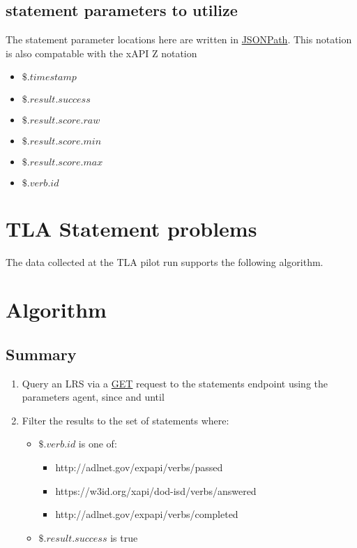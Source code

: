 \documentclass{article}
\begin{document}
\subsection{statement parameters to utilize}
The statement parameter locations here are written in
\href{http://goessner.net/articles/JsonPath/}{JSONPath}. This notation
is also compatable with the xAPI Z notation
\begin{itemize}
  \item $\$.timestamp$
  \item $\$.result.success$
  \item $\$.result.score.raw$
  \item $\$.result.score.min$
  \item $\$.result.score.max$
  \item $\$.verb.id$
  \end{itemize}

\section{TLA Statement problems}
The data collected at the TLA pilot run supports the following
algorithm.

\section{Algorithm}

\subsection{Summary}
\begin{enumerate}
  \item Query an LRS via a \href{https://github.com/adlnet/xAPI-Spec/blob/master/xAPI-Communication.md#213-get-statements}{GET} request to the statements endpoint using the parameters agent, since and until
  \item Filter the results to the set of statements where:
    \begin{itemize}
    \item $\$.verb.id$ is one of:
      \begin{itemize}
      \item http://adlnet.gov/expapi/verbs/passed
      \item https://w3id.org/xapi/dod-isd/verbs/answered
      \item http://adlnet.gov/expapi/verbs/completed
      \end{itemize}
    \item $\$.result.success$ is true
    \end{itemize}
  \end{enumerate}
\end{document}
